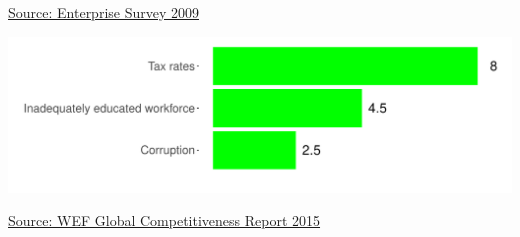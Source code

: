 \documentclass{article}\usepackage[]{graphicx}\usepackage[]{color}
\makeatletter
\def\maxwidth{ %
  \ifdim\Gin@nat@width>\linewidth
    \linewidth
  \else
    \Gin@nat@width
  \fi
}
\makeatother
\begin{document}
\begin{minipage}[b]{0.99\textwidth}
\begin{minipage}[b]{0.99\textwidth}
\begin{minipage}[c]{0.49\textwidth}
{}



      \hspace*{0.3cm} \raggedright\footnotesize{\href{https://www.enterprisesurveys.org/data}{Source: Enterprise Survey 2009}}
    \end{minipage}
    \begin{minipage}[c]{0.49\textwidth} %


{\centering \includegraphics[width=\maxwidth]{figure/top5constraintsWEF-1} 

}



    \hspace*{0.3cm} \raggedright\footnotesize{\href{http://www.weforum.org/reports/global-competitiveness-report-2015-2016}{Source: WEF Global Competitiveness Report 2015}}
    \end{minipage}
  \end{minipage}
\end{minipage}


\end{document}
